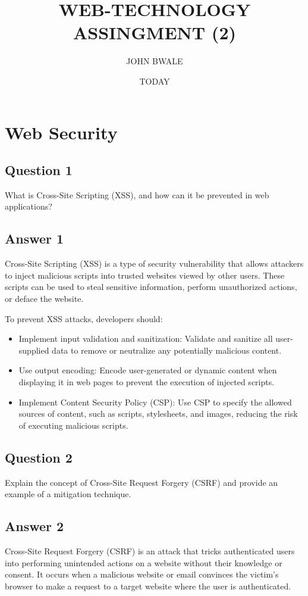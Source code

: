 \documentclass{article}
\begin{document}
\title{WEB-TECHNOLOGY ASSINGMENT (2)}
\author{JOHN BWALE}
\date{TODAY}
\maketitle

\section*{Web Security}

\subsection*{Question 1}
What is Cross-Site Scripting (XSS), and how can it be prevented in web applications?

\subsection*{Answer 1}
Cross-Site Scripting (XSS) is a type of security vulnerability that allows attackers to inject malicious scripts into trusted websites viewed by other users. These scripts can be used to steal sensitive information, perform unauthorized actions, or deface the website.

To prevent XSS attacks, developers should:
\begin{itemize}
  \item Implement input validation and sanitization: Validate and sanitize all user-supplied data to remove or neutralize any potentially malicious content.
  \item Use output encoding: Encode user-generated or dynamic content when displaying it in web pages to prevent the execution of injected scripts.
  \item Implement Content Security Policy (CSP): Use CSP to specify the allowed sources of content, such as scripts, stylesheets, and images, reducing the risk of executing malicious scripts.
\end{itemize}

\subsection*{Question 2}
Explain the concept of Cross-Site Request Forgery (CSRF) and provide an example of a mitigation technique.

\subsection*{Answer 2}
Cross-Site Request Forgery (CSRF) is an attack that tricks authenticated users into performing unintended actions on a website without their knowledge or consent. It occurs when a malicious website or email convinces the victim's browser to make a request to a target website where the user is authenticated.
\end{document}
